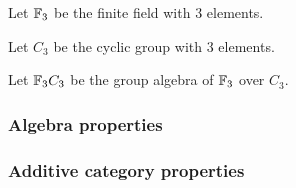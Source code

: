 \begin{notation}
    Let \( {\mathbb{F}}_3 \) be the finite field with \( 3 \) elements.
\end{notation}

\begin{notation}
    Let \( C_3 \) be the cyclic group with \( 3 \) elements.
\end{notation}

\begin{notation}
    Let \( {\mathbb{F}}_3 C_3 \) be the group algebra of \( {\mathbb{F}}_3 \) over \( C_3 \).
\end{notation}

\subsubsection{Algebra properties}



\subsubsection{Additive category properties}

